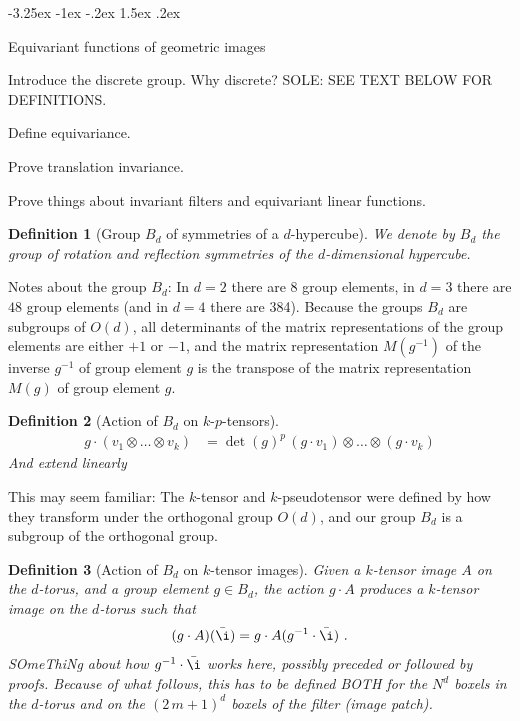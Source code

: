 \documentclass{article}
\makeatletter
\theoremstyle{plain}
\newtheorem{definition}{Definition}
\renewcommand\section{\@startsection {section}{1}{\z@}%
  {-3.25ex \@plus -1ex \@minus -.2ex}%
  {1.5ex \@plus .2ex}%
  {\raggedright\normalfont\large\bfseries}}%
\makeatother
\begin{document}
\section{Equivariant functions of geometric images}\label{sec:equivariant}

Introduce the discrete group. Why discrete? SOLE: SEE TEXT BELOW FOR DEFINITIONS.

Define equivariance.

Prove translation invariance.

Prove things about invariant filters and equivariant linear functions.

\begin{definition}[Group $B_d$ of symmetries of a $d$-hypercube]
We denote by $B_d$ the group of rotation and reflection symmetries of the $d$-dimensional hypercube.
\end{definition}

Notes about the group $B_d$: In $d=2$ there are $8$ group elements, in $d=3$ there are $48$ group elements (and in $d=4$ there are 384). Because the groups $B_d$ are subgroups of $O(d)$, all determinants of the matrix representations of the group elements are either $+1$ or $-1$, and the matrix representation $M(g^{-1})$ of the inverse $g^{-1}$ of group element $g$ is the transpose of the matrix representation $M(g)$ of group element $g$.

\begin{definition}[Action of $B_d$ on $k$-$p$-tensors]
\begin{align}
g\cdot(v_1 \otimes \ldots \otimes v_k) &= \det(g)^p\,(g\cdot v_1)\otimes\ldots\otimes(g\cdot v_k)
\end{align}
And extend linearly
\end{definition}

This may seem familiar: The $k$-tensor and $k$-pseudotensor were defined by how they transform under the orthogonal group $O(d)$, and our group $B_d$ is a subgroup of the orthogonal group.

\begin{definition}[Action of $B_d$ on $k$-tensor images]
Given a $k$-tensor image $A$ on the $d$-torus, and a group element $g\in B_d$, the action $g\cdot A$ produces a $k$-tensor image on the $d$-torus such that
\begin{equation}
    (g\cdot A)(\bar\i) = g\cdot A({g^{-1}\cdot \bar\i}) ~.
\end{equation}
SOmeThiNg about how $g^{-1}\cdot\bar\i$ works here, possibly preceded or followed by proofs. Because of what follows, this has to be defined BOTH for the $N^d$ boxels in the $d$-torus and on the $(2\,m+1)^d$ boxels of the filter (image patch).
\end{definition}
\end{document}
